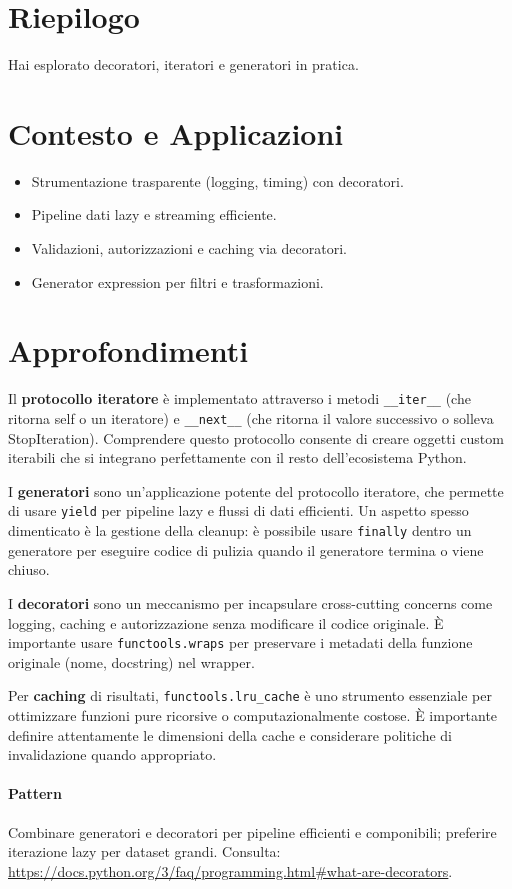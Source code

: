 \section{Riepilogo}
Hai esplorato decoratori, iteratori e generatori in pratica.

\section{Contesto e Applicazioni}
\begin{tcolorbox}[title=Contesto e Applicazioni]
\begin{itemize}
  \item Strumentazione trasparente (logging, timing) con decoratori.
  \item Pipeline dati lazy e streaming efficiente.
  \item Validazioni, autorizzazioni e caching via decoratori.
  \item Generator expression per filtri e trasformazioni.
\end{itemize}
\end{tcolorbox}

\section{Approfondimenti}
\begin{tcolorbox}[title=Spiegazioni dettagliate]
Il \textbf{protocollo iteratore} è implementato attraverso i metodi \verb|__iter__| (che ritorna self o un iteratore) e \verb|__next__| (che ritorna il valore successivo o solleva StopIteration). Comprendere questo protocollo consente di creare oggetti custom iterabili che si integrano perfettamente con il resto dell'ecosistema Python.

I \textbf{generatori} sono un'applicazione potente del protocollo iteratore, che permette di usare \verb|yield| per pipeline lazy e flussi di dati efficienti. Un aspetto spesso dimenticato è la gestione della cleanup: è possibile usare \verb|finally| dentro un generatore per eseguire codice di pulizia quando il generatore termina o viene chiuso.

I \textbf{decoratori} sono un meccanismo per incapsulare cross-cutting concerns come logging, caching e autorizzazione senza modificare il codice originale. È importante usare \verb|functools.wraps| per preservare i metadati della funzione originale (nome, docstring) nel wrapper.

Per \textbf{caching} di risultati, \verb|functools.lru_cache| è uno strumento essenziale per ottimizzare funzioni pure ricorsive o computazionalmente costose. È importante definire attentamente le dimensioni della cache e considerare politiche di invalidazione quando appropriato.
\end{tcolorbox}

\paragraph{Pattern} Combinare generatori e decoratori per pipeline efficienti e componibili; preferire iterazione lazy per dataset grandi.
Consulta: \url{https://docs.python.org/3/faq/programming.html#what-are-decorators}.
